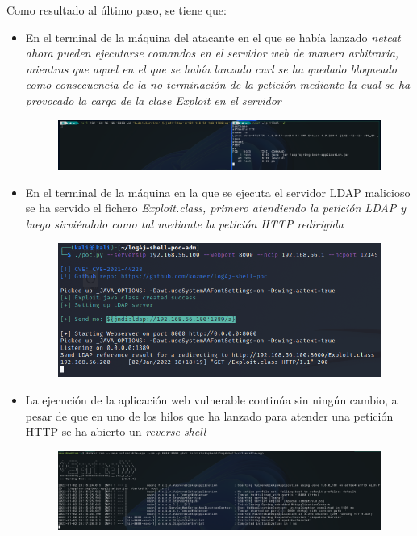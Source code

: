 \documentclass[../main.tex]{subfiles}
\begin{document}
Como resultado al último paso, se tiene que:
\begin{itemize}
    \item En el terminal de la máquina del atacante en el que se había lanzado \it{netcat} ahora pueden ejecutarse comandos en el servidor web de manera arbitraria, mientras que aquel en el que se había lanzado \it{curl} se ha quedado bloqueado como consecuencia de la no terminación de la petición mediante la cual se ha provocado la carga de la clase \it{Exploit} en el servidor
          
          \begin{figure}[H]
          \centering
          \includegraphics[width=13.5cm]{imagenes/4-ReverseShell/curl-netcat_after-attack.png}
          \end{figure}
    
    \item En el terminal de la máquina en la que se ejecuta el servidor LDAP malicioso se ha servido el fichero \it{Exploit.class}, primero atendiendo la petición LDAP y luego sirviéndolo como tal mediante la petición HTTP redirigida
          
          \begin{figure}[H]
          \centering
          \includegraphics[width=13.5cm]{imagenes/4-ReverseShell/exploit_after-attack.png}
          \end{figure}
    
    \item La ejecución de la aplicación web vulnerable continúa sin ningún cambio, a pesar de que en uno de los hilos que ha lanzado para atender una petición HTTP se ha abierto un \it{reverse shell}
          
          \begin{figure}[H]
          \centering
          \includegraphics[width=13.5cm]{imagenes/4-ReverseShell/vulnerable-app_log-after-attack.png}
          \end{figure}
    
\end{itemize}
\end{document}
